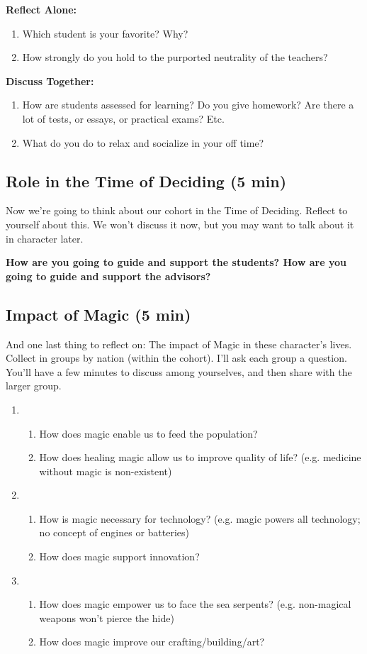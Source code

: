 \documentclass[green]{GL2020}
\begin{document}
\textbf{Reflect Alone:}
\begin{enumerate}
	\item Which student is your favorite? Why?
	\item How strongly do you hold to the purported neutrality of the teachers?
\end{enumerate}

\textbf{Discuss Together:}
\begin{enumerate}
	\item How are students assessed for learning? Do you give homework? Are there a lot of tests, or essays, or practical exams? Etc.
	\item What do you do to relax and socialize in your off time?
\end{enumerate}

\subsection*{Role in the Time of Deciding (5 min)}
Now we’re going to think about our cohort in the Time of Deciding. Reflect to yourself about this. We won't discuss it now, but you may want to talk about it in character later.

\textbf{How are you going to guide and support the students? How are you going to guide and support the advisors?}

\subsection*{Impact of Magic (5 min)}
And one last thing to reflect on: The impact of Magic in these character’s lives. Collect in groups by nation (within the cohort). I’ll ask each group a question. You’ll have a few minutes to discuss among yourselves, and then share with the larger group.
\begin{enumerate}
	\item \pFarm{}
	\begin{enumerate}
		\item How does magic enable us to feed the population?
		\item How does healing magic allow us to improve quality of life? (e.g. medicine without magic is non-existent)
	\end{enumerate}
	\item \pTech{}
	\begin{enumerate}
		\item How is magic necessary for technology? (e.g. magic powers all technology; no concept of engines or batteries)
		\item How does magic support innovation?
	\end{enumerate}
	\item \pShip{}
	\begin{enumerate}
		\item How does magic empower us to face the sea serpents? (e.g. non-magical weapons won’t pierce the hide)
		\item How does magic improve our crafting/building/art?
	\end{enumerate}
\end{enumerate}
\end{document}
